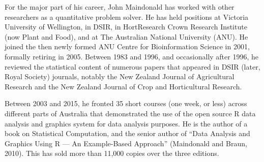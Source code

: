 \documentclass[
  10pt,
  b5paper]{book}
\begin{document}
For the major part of his career, John Maindonald has worked with other
researchers as a quantitative problem solver.
He has held positions at Victoria University of Wellington, in DSIR, in HortResearch Crown Research Institute (now Plant and Food), and at The Australian National University (ANU).
He joined the then newly formed ANU Centre for Bioinformation Science in 2001, formally retiring in 2005.
Between 1983 and 1996, and occasionally after 1996, he reviewed the statistical content of numerous papers that appeared in DSIR (later, Royal Society) journals, notably the New Zealand Journal of Agricultural Research and the New Zealand Journal of Crop and Horticultural Research.

Between 2003 and 2015, he fronted 35 short courses (one week, or less)
across different parts of Australia that demonstrated the use of the open source R data analysis and graphics system for data analysis purposes.
He is the author of a book on Statistical Computation, and the senior author of ``Data Analysis and Graphics Using R --- An Example-Based Approach'' (Maindonald and Braun, 2010).
This has sold more than 11,000 copies over the three editions.
\end{document}
